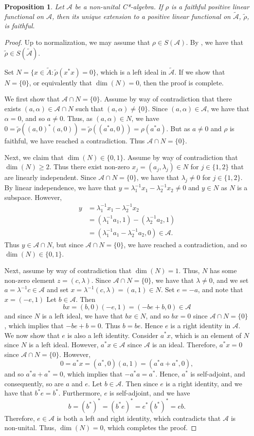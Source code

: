 \documentclass{amsart}
\theoremstyle{plain}
\newtheorem{proposition}[theorem]{Proposition}
\theoremstyle{definition}
\theoremstyle{remark}
\numberwithin{equation}{section}
\newcommand{\A}{{\mathcal{A}}}
\newcommand{\wt}[1]{{\widetilde{#1}}}
\newcommand{\la}{{\lambda}}
\newcommand{\al}{{\alpha}}
\renewcommand{\geq}{\geqslant}
\begin{document}
\begin{proposition}\label{p:faithful}
    Let $\A$ be a non-unital C*-algebra. If $\rho$ is a faithful positive linear functional  on $\A$, then its unique extension to a positive linear functional on  $\wt{\A}$, $\wt{\rho}$, is faithful.
\end{proposition}
\begin{proof}
    Up to normalization, we may assume that $\rho\in S(\A)$. By \cite[Proposition 2.1.5(vi)]{Dixmier-c-book}, we have that $\wt{\rho}\in S\left(\wt{\A}\right)$. 


Set $N=\{x\in \wt{A}: \wt{\rho}(x^*x)=0\}$, which is a left ideal in $\wt{\A}$. If we show that $N=\{0\}$, or equivalently that $\dim(N)=0$, then the proof is complete.


We first show that $\A\cap N=\{0\}$. Assume by way of contradiction that there exists $(a,\al)\in \A\cap N$ such that $(a,\al)\neq \{0\}$. Since $(a,\al)\in \A$, we have that $\al=0$, and so $a\neq 0$. Thus, as $(a,\al)\in N$, we have $0=\wt{\rho}((a,0)^*(a,0))=\wt{\rho}((a^*a,0))=\rho(a^*a)$. But as $a\neq 0$ and $\rho$ is faithful, we have reached a contradiction. Thus $\A\cap N=\{0\}$.


Next, we claim that $\dim(N)\in \{0,1\}$. Assume by way of contradiction that $\dim(N)\geq 2$. Thus there exist non-zero  $x_j=(a_j,\la_j)\in N$ for $j\in \{1,2\}$ that are linearly independent. Since $\A\cap N=\{0\}$, we have that $\la_j\neq 0$ for $j\in \{1,2\}$. By linear independence, we have that $y=\la_1^{-1}x_1-\la_2^{-1}x_2 \neq 0$ and $y\in N$ as $N$ is a subspace. However,
\begin{align*}
    y & = \la_1^{-1}x_1-\la_2^{-1}x_2\\
    &= (\la_1^{-1}a_1, 1)-(\la_2^{-1}a_2, 1)\\
    & = (\la_1^{-1}a_1-\la_2^{-1}a_2, 0)\in \A.
\end{align*}
Thus $y\in \A\cap N$, but since $\A\cap N=\{0\}$, we have reached a contradiction, and so $\dim(N)\in \{0,1\}$.

Next, assume by way of contradiction that $\dim(N)=1$. Thus, $N$ has some non-zero element $z=(c,\la)$. Since $\A\cap N=\{0\}$, we have that $\la \neq 0$, and we set $a=\la^{-1}c\in \A$ and set $x=\la^{-1}(c,\la)=(a,1)\in N$.  Set $e=-a$, and note that $x=(-e,1)$  Let $b\in \A$. Then
\[
bx=(b,0)(-e,1)=(-be+b, 0)\in \A
\]
and since $N$ is a left   ideal, we have that $bx\in N$, and so $bx=0$ since $\A\cap N=\{0\}$, which implies that $-be+b=0$. Thus $b=be$.  Hence $e$ is a right identity in $\A$. We now show that $e$ is also a left identity. Consider $a^*x$, which is an element of $N$ since $N$ is a left ideal. However, $a^*x\in \A$ since $\A$ is an ideal. Therefore, $a^*x=0$ since $\A\cap N=\{0\}$. However, 
\[
0=a^*x=(a^*,0)(a,1)=(a^*a+a^*,0),
\]
and so $a^*a+a^*=0$, which implies that $-a^*a=a^*$. Hence,  $a^*$ is self-adjoint, and consequently, so are $a$ and $e$. Let $b\in \A$. Then since $e$ is a right identity, and we have that $b^*e=b^*$. Furthermore,  $e$ is self-adjoint, and we have 
\[
b=(b^*)^*=(b^*e)^*=e^*(b^*)^*=eb.
\] Therefore, $e\in \A$ is both a left and right identity, which contradicts that $\A$ is non-unital.  Thus, $\dim(N)=0$, which completes the proof.
\end{proof}
\end{document}
